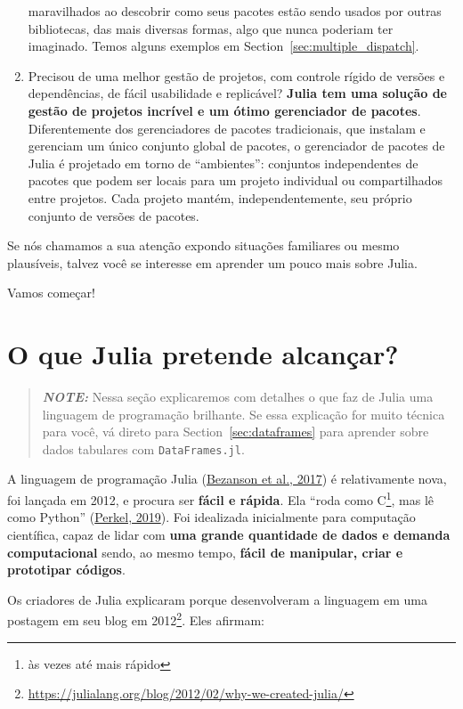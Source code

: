 \documentclass[
  notoc %
]{tufte-book}
\DeclareRobustCommand{\href}[2]{#2\footnote{\url{#1}}}
\newcommand{\passthrough}[1]{#1}
\begin{document}
\begin{enumerate}
  maravilhados ao descobrir como seus pacotes estão sendo usados por
  outras bibliotecas, das mais diversas formas, algo que nunca poderiam
  ter imaginado. Temos alguns exemplos em
  Section~\ref{sec:multiple_dispatch}.
\item
  Precisou de uma melhor gestão de projetos, com controle rígido de
  versões e dependências, de fácil usabilidade e replicável?
  \textbf{Julia tem uma solução de gestão de projetos incrível e um
  ótimo gerenciador de pacotes}. Diferentemente dos gerenciadores de
  pacotes tradicionais, que instalam e gerenciam um único conjunto
  global de pacotes, o gerenciador de pacotes de Julia é projetado em
  torno de ``ambientes'': conjuntos independentes de pacotes que podem
  ser locais para um projeto individual ou compartilhados entre
  projetos. Cada projeto mantém, independentemente, seu próprio conjunto
  de versões de pacotes.
\end{enumerate}

Se nós chamamos a sua atenção expondo situações familiares ou mesmo
plausíveis, talvez você se interesse em aprender um pouco mais sobre
Julia.

Vamos começar!

\hypertarget{sec:julia_accomplish}{%
\section{O que Julia pretende alcançar?}\label{sec:julia_accomplish}}

\begin{quote}
\textbf{\emph{NOTE:}} Nessa seção explicaremos com detalhes o que faz de
Julia uma linguagem de programação brilhante. Se essa explicação for
muito técnica para você, vá direto para Section~\ref{sec:dataframes}
para aprender sobre dados tabulares com
\passthrough{\lstinline!DataFrames.jl!}.
\end{quote}

A linguagem de programação Julia
(\protect\hyperlink{ref-bezanson2017julia}{Bezanson et al., 2017}) é
relativamente nova, foi lançada em 2012, e procura ser \textbf{fácil e
rápida}. Ela ``roda como C\footnote{às vezes até mais rápido}, mas lê
como Python'' (\protect\hyperlink{ref-perkelJuliaComeSyntax2019}{Perkel,
2019}). Foi idealizada inicialmente para computação científica, capaz de
lidar com \textbf{uma grande quantidade de dados e demanda
computacional} sendo, ao mesmo tempo, \textbf{fácil de manipular, criar
e prototipar códigos}.

Os criadores de Julia explicaram porque desenvolveram a linguagem em uma
postagem em seu blog em
\href{https://julialang.org/blog/2012/02/why-we-created-julia/}{2012}.
Eles afirmam:
\end{document}
